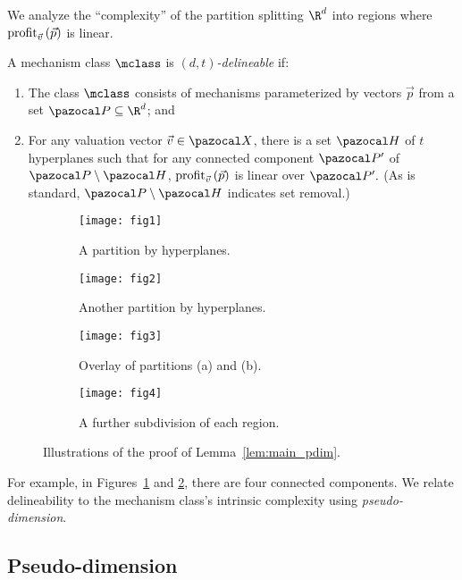 We analyze the ``complexity'' of the partition splitting $\R^d$ into regions where $\textnormal{profit}_{\vec{v}}\left(\vec{p}\right)$ is linear.
\begin{definition}\label{def:delineable} A mechanism class $\mclass$ is \emph{$\left(d,t\right)$-delineable} if:
\begin{enumerate}
\item The class $\mclass$ consists of mechanisms parameterized by vectors $\vec{p}$ from a set $\pspace \subseteq \R^d$; and
\item For any valuation vector $\vec{v} \in \domain$, there is a set $\hyp$ of $t$ hyperplanes such that for any connected component $\pspace'$ of $\pspace \setminus \hyp$, $\textnormal{profit}_{\vec{v}}\left(\vec{p}\right)$ is linear over $\pspace'.$ (As is standard, $\pspace \setminus \hyp$ indicates set removal.)
\end{enumerate}
\end{definition}
\begin{figure}
	\centering
	\begin{subfigure}{0.21\textwidth}
		\texttt{[image: fig1]} \centering
		\caption{A partition by hyperplanes.}
		\label{fig:overlay1}
	\end{subfigure}\qquad
	\begin{subfigure}{0.21\textwidth}
		\texttt{[image: fig2]}\centering
		\caption{Another partition by hyperplanes.}
		\label{fig:overlay2}
	\end{subfigure}\qquad
	\begin{subfigure}{0.21\textwidth}
		\texttt{[image: fig3]}\centering
		\caption{Overlay of partitions (a) and (b).}
		\label{fig:overlay3}
	\end{subfigure}\qquad
	\begin{subfigure}{0.21\textwidth}
		\texttt{[image: fig4]}\centering
		\caption{A further subdivision of each region.}
		\label{fig:subpartition}
	\end{subfigure}
	\caption{Illustrations of the proof of Lemma~\ref{lem:main_pdim}.}
	\label{fig:overlay}
\end{figure}
For example, in Figures~\ref{fig:overlay1} and \ref{fig:overlay2}, there are four connected components.
We relate delineability to the mechanism class's intrinsic complexity using \emph{pseudo-dimension}.
\subsection{Pseudo-dimension}

